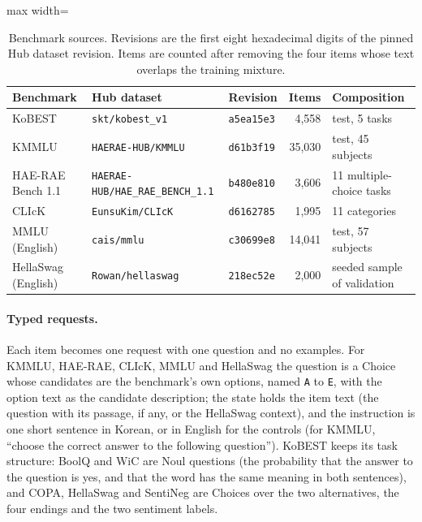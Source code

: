 \begin{table}[t]
\centering
\small
\caption{Benchmark sources. Revisions are the first eight hexadecimal digits of the pinned
Hub dataset revision. Items are counted after removing the four items whose text overlaps
the training mixture.}
\label{tab:kbench_sources}
\begin{adjustbox}{max width=\linewidth}
\begin{tabular}{@{}lllrl@{}}
\toprule
Benchmark & Hub dataset & Revision & Items & Composition \\
\midrule
KoBEST & \texttt{skt/kobest\_v1} & \texttt{a5ea15e3} & 4,558 & test, 5 tasks \\
KMMLU & \texttt{HAERAE-HUB/KMMLU} & \texttt{d61b3f19} & 35,030 & test, 45 subjects \\
HAE-RAE Bench 1.1 & \texttt{HAERAE-HUB/HAE\_RAE\_BENCH\_1.1} & \texttt{b480e810} & 3,606 & 11 multiple-choice tasks \\
CLIcK & \texttt{EunsuKim/CLIcK} & \texttt{d6162785} & 1,995 & 11 categories \\
\midrule
MMLU (English) & \texttt{cais/mmlu} & \texttt{c30699e8} & 14,041 & test, 57 subjects \\
HellaSwag (English) & \texttt{Rowan/hellaswag} & \texttt{218ec52e} & 2,000 & seeded sample of validation \\
\bottomrule
\end{tabular}
\end{adjustbox}
\end{table}

\paragraph{Typed requests.}
Each item becomes one request with one question and no examples. For KMMLU, HAE-RAE, CLIcK,
MMLU and HellaSwag the question is a Choice whose candidates are the benchmark's own options,
named \texttt{A} to \texttt{E}, with the option text as the candidate description; the state
holds the item text (the question with its passage, if any, or the HellaSwag context), and
the instruction is one
short sentence in Korean, or in English for the controls (for KMMLU, ``choose the correct
answer to the following question''). KoBEST keeps its task structure: BoolQ and WiC are Noul
questions (the probability that the answer to the question is yes, and that the word has the
same meaning in both sentences), and COPA, HellaSwag and SentiNeg are Choices over the two
alternatives, the four endings and the two sentiment labels.

